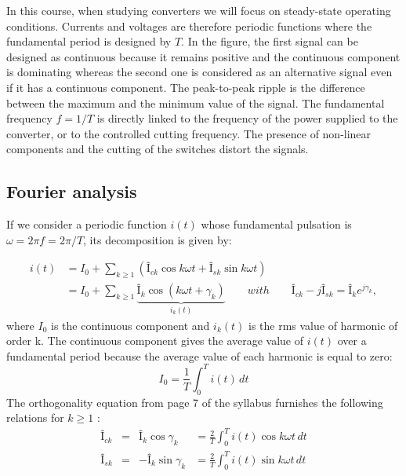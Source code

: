 	In this course, when studying converters we will focus on steady-state operating conditions. Currents and voltages are therefore periodic functions where the fundamental period is designed by $T$. In the figure, the first signal can be designed as continuous because it remains positive and the continuous component is dominating whereas the second one is considered as an alternative signal even if it has a continuous component. The peak-to-peak ripple is the difference between the maximum and the minimum value of the signal. The fundamental frequency $f = 1/T$ is directly linked to the frequency of the power supplied to the converter, or to the controlled cutting frequency. The presence of non-linear components and the cutting of the switches distort the signals.

		
	\subsection{Fourier analysis}
	If we consider a periodic function $i(t)$ whose fundamental pulsation is $\omega = 2\pi f = 2\pi /T$, its decomposition is given by:

	\begin{equation}
	\begin{aligned}
		i(t) &= I_0 + \sum _{k\geq 1} \left(Î_{ck} \cos k\omega t + Î_{sk} \sin k\omega t\right)\\
			&= I_0 + \sum _{k\geq 1} \underbrace{Î_k \cos (k\omega t +\gamma _k)}_{i_k(t)} \qquad with \qquad Î_{ck} - jÎ_{sk} = Î_k e^{j\gamma _k},
	\end{aligned}
	\end{equation}
	where $I_0$ is the continuous component and $i_k(t)$ is the rms value of harmonic of order k. The continuous component gives the average value of $i(t)$ over a fundamental period because the average value of each harmonic is equal to zero: 
	\begin{equation}
		I_0 = \frac{1}{T}\int _0 ^T i(t)\, dt
	\end{equation}
	The orthogonality equation from page 7 of the syllabus furnishes the following relations for $k\geq 1$ : 
	\begin{equation}
	\begin{aligned}
		Î_{ck} &= &Î_k \cos \gamma _k &= \frac{2}{T} \int _0 ^T i(t) \cos k\omega t\, dt\\
		Î_{sk} &= &-Î_k \sin \gamma _k &= \frac{2}{T} \int _0 ^T i(t) \sin k\omega t\, dt
	\end{aligned}
	\end{equation}
	
